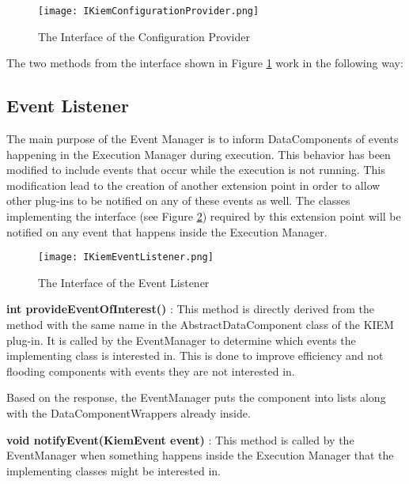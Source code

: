 \begin{figure}[Configuration Provider Interface]
  \centering
  \texttt{[image: IKiemConfigurationProvider.png]}
  \caption[The Interface of the Configuration Provider]%
  {The Interface of the Configuration Provider\protect}
  \label{fig:UMLConfigurationProvider}
\end{figure}

The two methods from the interface shown in Figure \ref{fig:UMLConfigurationProvider} work
in the following way:

\subsection{Event Listener}
\label{section:EventListener}
The main purpose of the Event Manager is to inform DataComponents of events
happening in the Execution Manager during execution. This behavior has been modified to include 
events that occur while the execution is not running. This modification lead to the 
creation of another extension point in order to allow other plug-ins to be notified
on any of these events as well. The classes implementing the interface 
(see Figure \ref{fig:UMLEventListener}) required by this extension point will be notified
on any event that happens inside the Execution Manager.

\begin{figure}[Event Listener Interface]
  \centering
  \texttt{[image: IKiemEventListener.png]}
  \caption[The Interface of the Event Listener]%
  {The Interface of the Event Listener\protect}
  \label{fig:UMLEventListener}
\end{figure}

\begin{description}
 \item \textbf{int provideEventOfInterest()} : This method is directly derived from the method with 
the same name in the AbstractDataComponent class of the \ac{KIEM} plug-in. It is called by the
EventManager to determine which events the implementing class is interested in.
This is done to improve efficiency and not flooding components with events they are not interested in.

Based on the response, the EventManager puts the component into lists along with the DataComponentWrappers
already inside.
 \item \textbf{void notifyEvent(KiemEvent event)} : This method is called by the EventManager when 
something happens inside the Execution Manager that the implementing classes might be interested in.
\end{description}

